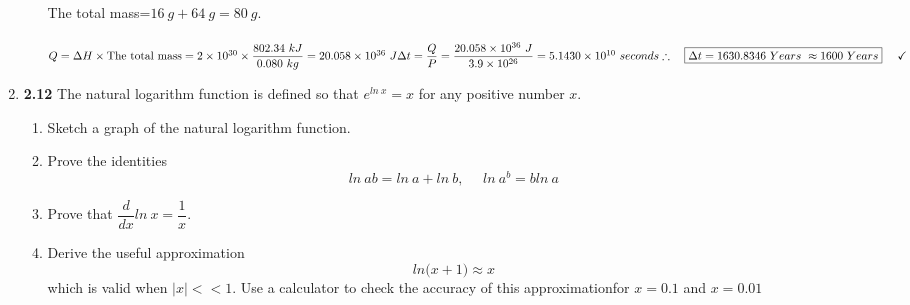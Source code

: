 \documentclass[fleqn]{article}
\begin{document}
\begin{enumerate}
\begin{enumerate}
          \textcolor{hwColor}{
            \\
            The total mass=$16 ~ g+64 ~ g=80 ~ g$.
            \\
            \\
            $
              Q=\Delta H \times \text{The total mass}= 2 \times 10^{30} \times \dfrac{802.34 ~ kJ}{0.080 ~ kg}
              =20.058 \times 10^{36} ~ J
              \\
              \\
              \\
              \Delta t=\dfrac{Q}{P}=\dfrac{20.058 \times 10^{36} ~ J}{3.9 \times 10^{26}}=5.1430 \times 10^{10} ~ seconds
              \\
              \\
              \\
              \therefore ~~~ \boxed{
                \Delta t=1630.8346 ~ Years ~ \approx 1600 ~ Years 
              } ~~~~ \checkmark
              \\
            $
          }

    \end{enumerate}

    \item \textbf{2.12} The natural logarithm function is defined so that $e^{ln ~ x}=x$ for any positive number $x$.
    \begin{enumerate}
      \item Sketch a graph of the natural logarithm function.


      \item Prove the identities
      $$
        ln ~ ab=ln ~ a+ln ~ b, ~~~~~~ ln ~ a^b=bln ~ a
      $$


      \item Prove that $\dfrac{d}{dx} ln ~ x=\dfrac{1}{x}$.


      \item Derive the useful approximation 
      $$
        ln \bigg( x+1 \bigg) \approx x
      $$
      which is valid when $|x| << 1$. Use a calculator to check the accuracy of this approximationfor $x=0.1$ and $x=0.01$


\end{enumerate}
\end{enumerate}
\end{document}
